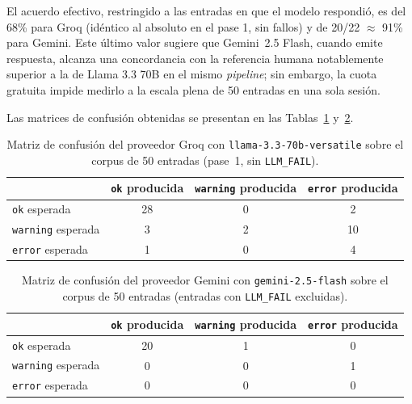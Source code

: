 El acuerdo efectivo, restringido a las entradas en que el modelo respondió, es
del 68\% para Groq (idéntico al absoluto en el pase 1, sin fallos) y de 20/22
$\approx$ 91\% para Gemini. Este último valor sugiere que Gemini~2.5 Flash,
cuando emite respuesta, alcanza una concordancia con la referencia humana
notablemente superior a la de Llama 3.3 70B en el mismo \textit{pipeline}; sin
embargo, la cuota gratuita impide medirlo a la escala plena de 50 entradas en
una sola sesión.

Las matrices de confusión obtenidas se presentan en las
Tablas~\ref{tab:matriz-groq} y~\ref{tab:matriz-gemini}.

\begin{table}[ht]
	\centering
	\small
	\begin{tabular}{l|ccc}
		\hline
		                          & \texttt{ok} producida & \texttt{warning} producida & \texttt{error} producida \\
		\hline
		\texttt{ok} esperada      & 28                    & 0                          & 2                        \\
		\texttt{warning} esperada & 3                     & 2                          & 10                       \\
		\texttt{error} esperada   & 1                     & 0                          & 4                        \\
		\hline
	\end{tabular}
	\caption{Matriz de confusión del proveedor Groq con
		\texttt{llama-3.3-70b-versatile} sobre el corpus de 50 entradas
		(pase~1, sin \texttt{LLM\_FAIL}).}
	\label{tab:matriz-groq}
\end{table}

\begin{table}[ht]
	\centering
	\small
	\begin{tabular}{l|ccc}
		\hline
		                          & \texttt{ok} producida & \texttt{warning} producida & \texttt{error} producida \\
		\hline
		\texttt{ok} esperada      & 20                    & 1                          & 0                        \\
		\texttt{warning} esperada & 0                     & 0                          & 1                        \\
		\texttt{error} esperada   & 0                     & 0                          & 0                        \\
		\hline
	\end{tabular}
	\caption{Matriz de confusión del proveedor Gemini con
		\texttt{gemini-2.5-flash} sobre el corpus de 50 entradas (entradas con
		\texttt{LLM\_FAIL} excluidas).}
	\label{tab:matriz-gemini}
\end{table}

